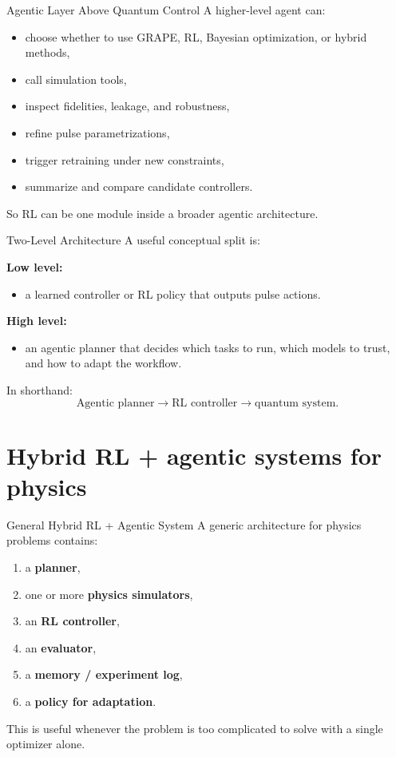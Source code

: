 \documentclass[aspectratio=169]{beamer}
\begin{document}
\begin{frame}{Agentic Layer Above Quantum Control}
A higher-level agent can:
\begin{itemize}
    \item choose whether to use GRAPE, RL, Bayesian optimization, or hybrid methods,
    \item call simulation tools,
    \item inspect fidelities, leakage, and robustness,
    \item refine pulse parametrizations,
    \item trigger retraining under new constraints,
    \item summarize and compare candidate controllers.
\end{itemize}

So RL can be one module inside a broader agentic architecture.
\end{frame}

\begin{frame}{Two-Level Architecture}
A useful conceptual split is:

\medskip

\textbf{Low level:}
\begin{itemize}
    \item a learned controller or RL policy that outputs pulse actions.
\end{itemize}

\textbf{High level:}
\begin{itemize}
    \item an agentic planner that decides which tasks to run, which models to trust, and how to adapt the workflow.
\end{itemize}

In shorthand:
\[
\text{Agentic planner} \longrightarrow \text{RL controller} \longrightarrow \text{quantum system}.
\]
\end{frame}

\section{Hybrid RL + agentic systems for physics}

\begin{frame}{General Hybrid RL + Agentic System}
A generic architecture for physics problems contains:
\begin{enumerate}
    \item a \textbf{planner},
    \item one or more \textbf{physics simulators},
    \item an \textbf{RL controller},
    \item an \textbf{evaluator},
    \item a \textbf{memory / experiment log},
    \item a \textbf{policy for adaptation}.
\end{enumerate}

This is useful whenever the problem is too complicated to solve with a single optimizer alone.
\end{frame}
\end{document}
